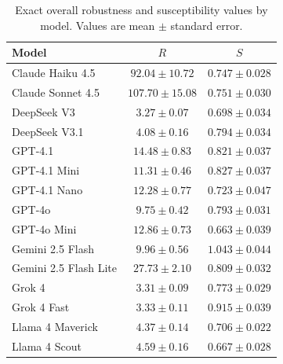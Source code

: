 \begin{table}[t!]
  \centering
  \caption{Exact overall robustness and susceptibility values by model. Values are mean $\pm$ standard error.}
  \label{tab:metric_values_overall}
  \small
  \begin{tabular}{lcc}
    \toprule
    Model & $R$ & $S$ \\
    \midrule
    Claude Haiku 4.5 & $92.04 \pm 10.72$ & $0.747 \pm 0.028$ \\
    Claude Sonnet 4.5 & $107.70 \pm 15.08$ & $0.751 \pm 0.030$ \\
    DeepSeek V3 & $3.27 \pm 0.07$ & $0.698 \pm 0.034$ \\
    DeepSeek V3.1 & $4.08 \pm 0.16$ & $0.794 \pm 0.034$ \\
    GPT-4.1 & $14.48 \pm 0.83$ & $0.821 \pm 0.037$ \\
    GPT-4.1 Mini & $11.31 \pm 0.46$ & $0.827 \pm 0.037$ \\
    GPT-4.1 Nano & $12.28 \pm 0.77$ & $0.723 \pm 0.047$ \\
    GPT-4o & $9.75 \pm 0.42$ & $0.793 \pm 0.031$ \\
    GPT-4o Mini & $12.86 \pm 0.73$ & $0.663 \pm 0.039$ \\
    Gemini 2.5 Flash & $9.96 \pm 0.56$ & $1.043 \pm 0.044$ \\
    Gemini 2.5 Flash Lite & $27.73 \pm 2.10$ & $0.809 \pm 0.032$ \\
    Grok 4 & $3.31 \pm 0.09$ & $0.773 \pm 0.029$ \\
    Grok 4 Fast & $3.33 \pm 0.11$ & $0.915 \pm 0.039$ \\
    Llama 4 Maverick & $4.37 \pm 0.14$ & $0.706 \pm 0.022$ \\
    Llama 4 Scout & $4.59 \pm 0.16$ & $0.667 \pm 0.028$ \\
    \bottomrule
  \end{tabular}
\end{table}
